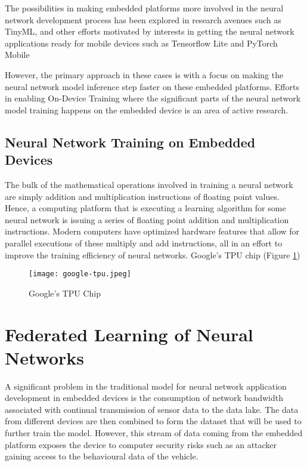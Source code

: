The possibilities in making embedded platforms more involved in the neural network development process has been explored in research avenues such as TinyML\cite{tinyml}, and other efforts motivated by interests in getting the neural network applications ready for mobile devices such as Tensorflow Lite\cite{tfl} and PyTorch Mobile \cite{pytorch-mobile}

However, the primary approach in these cases is with a focus on making the neural network model inference step faster on these embedded platforms. Efforts in enabling On-Device Training where the significant parts of the neural network model training happens on the embedded device is an area of active research.


\subsection{Neural Network Training on Embedded Devices}

The bulk of the mathematical operations involved in training a neural network are simply addition and multiplication instructions of floating point values. Hence, a computing platform that is executing a learning algorithm for some neural network is issuing a series of floating point addition and multiplication instructions. Modern computers have optimized hardware features that allow for parallel executions of these multiply and add instructions, all in an effort to improve the training efficiency of neural networks. Google's TPU chip (Figure \ref{fig:google-tpu})

\begin{figure}[h]
	\centering
	\texttt{[image: google-tpu.jpeg]}
	\caption{Google's TPU Chip}
	\label{fig:google-tpu}
\end{figure}

\section{Federated Learning of Neural Networks}

A significant problem in the traditional model for neural network application development in embedded devices is the consumption of network bandwidth associated with continual transmission of sensor data to the data lake. The data from different devices are then combined to form the dataset that will be used to further train the model. However, this stream of data coming from the embedded platform exposes the device to computer security risks such as an attacker gaining access to the behavioural data of the vehicle.

